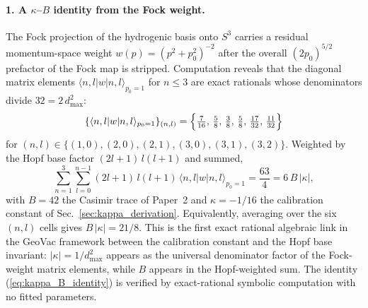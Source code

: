 \documentclass[aps,pra,twocolumn,superscriptaddress,longbibliography]{revtex4-2}
\begin{document}
\paragraph{1. A $\kappa$--$B$ identity from the Fock weight.}
The Fock projection of the hydrogenic basis onto $S^3$ carries a
residual momentum-space weight
$w(p) = (p^2 + p_0^2)^{-2}$
after the overall $(2p_0)^{5/2}$ prefactor of the Fock map is
stripped.  Computation reveals that the diagonal matrix elements
$\langle n,l|w|n,l\rangle_{p_0 = 1}$ for $n \le 3$ are exact
rationals whose denominators divide $32 = 2\,d_{\max}^2$:
\begin{equation}
  \{\langle n,l|w|n,l\rangle_{p_0 = 1}\}_{(n,l)}
  = \Bigl\{ \tfrac{7}{16},\, \tfrac{5}{8},\, \tfrac{3}{8},\,
            \tfrac{5}{8},\, \tfrac{17}{32},\, \tfrac{11}{32} \Bigr\}
  \label{eq:fock_weight_values}
\end{equation}
for $(n,l) \in \{(1,0),(2,0),(2,1),(3,0),(3,1),(3,2)\}$.  Weighted
by the Hopf base factor $(2l+1)\,l(l+1)$ and summed,
\begin{equation}
  \sum_{n=1}^{3}\sum_{l=0}^{n-1} (2l+1)\,l(l+1)\,
    \langle n,l|w|n,l\rangle_{p_0 = 1}
  = \frac{63}{4}
  = 6\,B\,|\kappa|,
  \label{eq:kappa_B_identity}
\end{equation}
with $B = 42$ the Casimir trace of Paper~2 and $\kappa = -1/16$
the calibration constant of Sec.~\ref{sec:kappa_derivation}.
Equivalently, averaging over the six $(n,l)$ cells gives
$B\,|\kappa| = 21/8$.  This is the first exact rational algebraic
link in the GeoVac framework between the calibration constant and
the Hopf base invariant: $|\kappa| = 1/d_{\max}^2$ appears as the
universal denominator factor of the Fock-weight matrix elements,
while $B$ appears in the Hopf-weighted sum.  The identity
(\ref{eq:kappa_B_identity}) is verified by exact-rational symbolic
computation with no fitted parameters.
\end{document}

